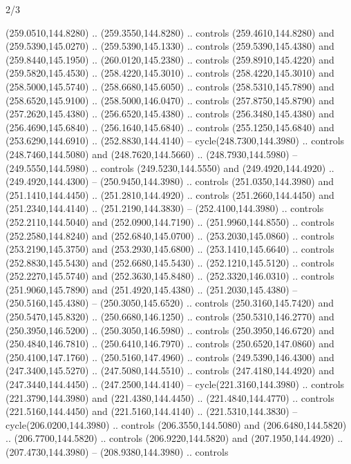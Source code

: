 \begin{flagdescription}{2/3}
\begin{scope}[xshift=0.5\flaglength,yshift=0.5\flagwidth,scale=\flagwidth/259.2]
\begin{scope}[y=0.8pt, x=0.8pt, yscale=-1,shift={(-243,-162)}]
      (259.0510,144.8280) .. (259.3550,144.8280) .. controls (259.4610,144.8280) and
      (259.5390,145.0270) .. (259.5390,145.1330) .. controls (259.5390,145.4380) and
      (259.8440,145.1950) .. (260.0120,145.2380) .. controls (259.8910,145.4220) and
      (259.5820,145.4530) .. (258.4220,145.3010) .. controls (258.4220,145.3010) and
      (258.5000,145.5740) .. (258.6680,145.6050) .. controls (258.5310,145.7890) and
      (258.6520,145.9100) .. (258.5000,146.0470) .. controls (257.8750,145.8790) and
      (257.2620,145.4380) .. (256.6520,145.4380) .. controls (256.3480,145.4380) and
      (256.4690,145.6840) .. (256.1640,145.6840) .. controls (255.1250,145.6840) and
      (253.6290,144.6910) .. (252.8830,144.4140) -- cycle(248.7300,144.3980) ..
      controls (248.7460,144.5080) and (248.7620,144.5660) .. (248.7930,144.5980) --
      (249.5550,144.5980) .. controls (249.5230,144.5550) and (249.4920,144.4920) ..
      (249.4920,144.4300) -- (250.9450,144.3980) .. controls (251.0350,144.3980) and
      (251.1410,144.4450) .. (251.2810,144.4920) .. controls (251.2660,144.4450) and
      (251.2340,144.4140) .. (251.2190,144.3830) -- (252.4100,144.3980) .. controls
      (252.2110,144.5040) and (252.0900,144.7190) .. (251.9960,144.8550) .. controls
      (252.2580,144.8240) and (252.6840,145.0700) .. (253.2030,145.0860) .. controls
      (253.2190,145.3750) and (253.2930,145.6800) .. (253.1410,145.6640) .. controls
      (252.8830,145.5430) and (252.6680,145.5430) .. (252.1210,145.5120) .. controls
      (252.2270,145.5740) and (252.3630,145.8480) .. (252.3320,146.0310) .. controls
      (251.9060,145.7890) and (251.4920,145.4380) .. (251.2030,145.4380) --
      (250.5160,145.4380) -- (250.3050,145.6520) .. controls (250.3160,145.7420) and
      (250.5470,145.8320) .. (250.6680,146.1250) .. controls (250.5310,146.2770) and
      (250.3950,146.5200) .. (250.3050,146.5980) .. controls (250.3950,146.6720) and
      (250.4840,146.7810) .. (250.6410,146.7970) .. controls (250.6520,147.0860) and
      (250.4100,147.1760) .. (250.5160,147.4960) .. controls (249.5390,146.4300) and
      (247.3400,145.5270) .. (247.5080,144.5510) .. controls (247.4180,144.4920) and
      (247.3440,144.4450) .. (247.2500,144.4140) -- cycle(221.3160,144.3980) ..
      controls (221.3790,144.3980) and (221.4380,144.4450) .. (221.4840,144.4770) ..
      controls (221.5160,144.4450) and (221.5160,144.4140) .. (221.5310,144.3830) --
      cycle(206.0200,144.3980) .. controls (206.3550,144.5080) and
      (206.6480,144.5820) .. (206.7700,144.5820) .. controls (206.9220,144.5820) and
      (207.1950,144.4920) .. (207.4730,144.3980) -- (208.9380,144.3980) .. controls

\end{scope}
\end{scope}
\end{flagdescription}

